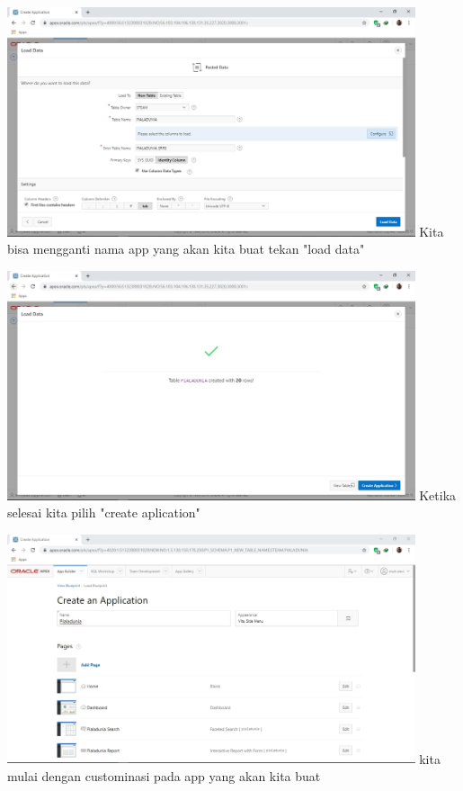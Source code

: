 \documentclass[12pt, times news roman, a4paper] {article}
\begin{document}
	\begin{minipage}{\linewidth}
	\centering
	\includegraphics[width=12cm]{Capture7.jpg} 
	 {Kita bisa mengganti nama app yang akan kita buat tekan "load data"}
\end{minipage}

	\begin{minipage}{\linewidth}
	\centering
	\includegraphics[width=12cm]{Capture9.jpg} 
	 {Ketika selesai kita pilih "create aplication"}
\end{minipage}

	\begin{minipage}{\linewidth}
	\centering
	\includegraphics[width=12cm]{Capture10.jpg} 
	 {kita mulai dengan custominasi pada app yang akan kita buat}
\end{minipage}
\end{document}
